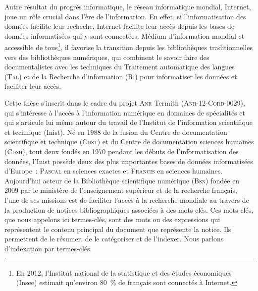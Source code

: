     Autre résultat du progrès informatique, le réseau informatique mondial,
    Internet, joue un rôle crucial dans l'ère de l'information. En effet, si
    l'informatisation des données facilite leur recheche, Internet facilite leur
    accès depuis les bases de données informatisées qui y sont connectées.
    Médium d'information mondial et accessible de tous\footnote{En 2012,
    l'Institut national de la statistique et des études économiques (Insee)
    estimait qu'environ 80~\% de français sont connectés à Internet.}, il
    favorise la transition depuis les bibliothèques traditionnelles vers des
    bibliothèques numériques, qui combinent le savoir faire des documentalistes
    avec les techniques du Traitement automatique des langues (\textsc{Tal}) et
    de la Recherche d'information (\textsc{Ri}) pour informatiser les données et
    faciliter leur accès.

    Cette thèse s'inscrit dans le cadre du projet \textsc{Anr} Termith
    (\textsc{Anr-12-Cord-0029}), qui s'intéresse à l'accès à l'information
    numérique en domaines de spécialités et qui s'articule lui même autour du
    travail de l'Institut de l'information scientifique et technique (Inist). Né
    en 1988 de la fusion du Centre de documentation scientifique et technique
    (\textsc{Cdst}) et du Centre de documentation sciences humaines
    (\textsc{Cdsh}), tout deux fondés en 1970 pendant les débuts de
    l'informatisation des données, l'Inist possède deux des plus importantes
    bases de données informatisées d'Europe~: \textsc{Pascal} en sciences
    exactes et \textsc{Francis} en sciences humaines. Aujourd'hui acteur de la
    Bibliothèque scientifique numérique (\textsc{Bsn}) fondée en 2009 par le
    ministère de l'enseignement supérieur et de la recherche français, l'une de
    ses missions est de faciliter l'accès à la recherche mondiale au travers de
    la production de notices bibliographiques associées à des mots-clés. Ces
    mots-clés, que nous appelons ici termes-clés, sont des mots ou des
    expressions qui représentent le contenu principal du document que représente
    la notice. Ils permettent de le résumer, de le catégoriser et de l'indexer.
    Nous parlons d'indexation par termes-clés.
    

